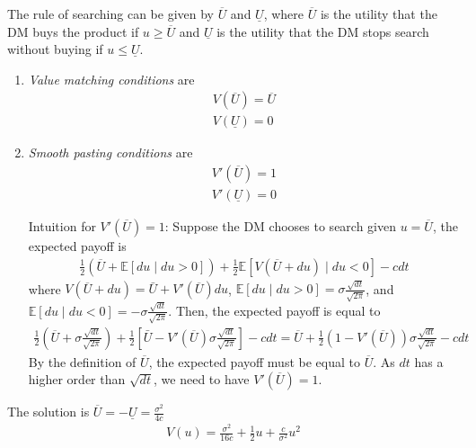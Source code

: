\documentclass[11pt]{elegantbook}
\begin{document}
The rule of searching can be given by $\overline{U}$ and $\underline{U}$, where $\overline{U}$ is the utility that the DM buys the product if $u\geq \overline{U}$ and $\underline{U}$ is the utility that the DM stops search without buying if $u\leq \underline{U}$.
\begin{enumerate}
    \item \textit{Value matching conditions} are
    \begin{equation}
        \begin{aligned}
            V(\overline{U})=\overline{U}\\
            V(\underline{U})=0
        \end{aligned}
        \nonumber
    \end{equation}
    \item \textit{Smooth pasting conditions} are
    \begin{equation}
        \begin{aligned}
            V'(\overline{U})=1\\
            V'(\underline{U})=0
        \end{aligned}
        \nonumber
    \end{equation}
    \begin{remark}
        Intuition for $V'(\overline{U})=1$: Suppose the DM chooses to search given $u=\overline{U}$, the expected payoff is
    \begin{equation}
        \begin{aligned}
            \frac{1}{2}\left(\overline{U}+\mathbb{E}[du\mid du>0]\right)+\frac{1}{2}\mathbb{E}\left[V(\overline{U}+du)\mid du<0\right]-cdt
        \end{aligned}
        \nonumber
    \end{equation}
    where $V(\overline{U}+du)=\bar{U}+V'(\overline{U})du$, $\mathbb{E}[du\mid du>0]=\sigma\frac{\sqrt{dt}}{\sqrt{2\pi}}$, and $\mathbb{E}[du\mid du<0]=-\sigma\frac{\sqrt{dt}}{\sqrt{2\pi}}$. Then, the expected payoff is equal to
    \begin{equation}
        \begin{aligned}
            \frac{1}{2}\left(\overline{U}+\sigma\frac{\sqrt{dt}}{\sqrt{2\pi}}\right)+\frac{1}{2}\left[\bar{U}-V'(\overline{U})\sigma\frac{\sqrt{dt}}{\sqrt{2\pi}}\right]-cdt=\overline{U}+\frac{1}{2}\left(1-V'(\overline{U})\right)\sigma\frac{\sqrt{dt}}{\sqrt{2\pi}}-cdt
        \end{aligned}
        \nonumber
    \end{equation}
    By the definition of $\overline{U}$, the expected payoff must be equal to $\overline{U}$. As $dt$ has a higher order than $\sqrt{dt}$, we need to have $V'(\overline{U})=1$.
    \end{remark}
\end{enumerate}
The solution is $\overline{U}=-\underline{U}=\frac{\sigma^2}{4c}$
\begin{equation}
    \begin{aligned}
        V(u)=\frac{\sigma^2}{16c}+\frac{1}{2}u +\frac{c}{\sigma^2}u^2
    \end{aligned}
    \nonumber
\end{equation}
\end{document}
